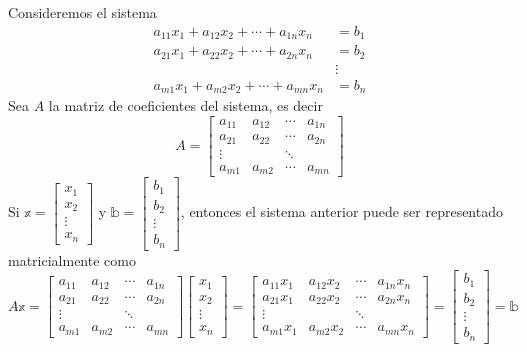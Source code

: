 Consideremos el sistema
\begin{align*}
    a_{11}x_1 + a_{12}x_2 + \cdots + a_{1n}x_n &= b_1 \\
    a_{21}x_1 + a_{22}x_2 + \cdots + a_{2n}x_n &= b_2 \\
    &\vdots \\
    a_{m1}x_1 + a_{m2}x_2 + \cdots + a_{mn}x_n &= b_n
\end{align*}
Sea \( A \) la matriz de coeficientes del sistema, es decir
\[
    A = \begin{bmatrix}
        a_{11} & a_{12} & \cdots & a_{1n}\\
        a_{21} & a_{22} & \cdots & a_{2n}\\
        \vdots &  & \ddots & \\
        a_{m1} & a_{m2} & \cdots & a_{mn}
    \end{bmatrix}
\] \newpage\noindent
Si \( \mathbb{x} = \begin{bmatrix} x_1 \\ x_2 \\ \vdots \\ x_n \end{bmatrix} \) y \( \mathbb{b} = \begin{bmatrix} b_1 \\ b_2 \\ \vdots \\ b_n \end{bmatrix} \), entonces el sistema anterior puede ser representado matricialmente como
\[
    A\mathbb{x} = \begin{bmatrix}
        a_{11} & a_{12} & \cdots & a_{1n}\\
        a_{21} & a_{22} & \cdots & a_{2n}\\
        \vdots &  & \ddots & \\
        a_{m1} & a_{m2} & \cdots & a_{mn}
    \end{bmatrix}
    \begin{bmatrix}
        x_1 \\
        x_2 \\
        \vdots \\
        x_n
    \end{bmatrix}
    =
    \begin{bmatrix}
        a_{11}x_1 & a_{12}x_2 & \cdots & a_{1n}x_n \\
        a_{21}x_1 & a_{22}x_2 & \cdots & a_{2n}x_n \\
        \vdots &  & \ddots & \\
        a_{m1}x_1 & a_{m2}x_2 & \cdots & a_{mn}x_n
    \end{bmatrix}
    =
    \begin{bmatrix}
        b_1 \\
        b_2 \\
        \vdots \\
        b_n
    \end{bmatrix}
    = \mathbb{b}
\]
